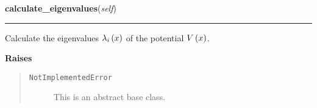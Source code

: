     \vspace{0.5ex}

\hspace{.8\funcindent}\begin{boxedminipage}{\funcwidth}

    \raggedright \textbf{calculate\_eigenvalues}(\textit{self})

    \vspace{-1.5ex}

    \rule{\textwidth}{0.5\fboxrule}
\setlength{\parskip}{2ex}
    Calculate the eigenvalues
    $\lambda_i\left( x \right)$ of the potential
    $V\left( x \right)$.

\setlength{\parskip}{1ex}
      \textbf{Raises}
    \vspace{-1ex}

      \begin{quote}
        \begin{description}

          \item[\texttt{NotImplementedError}]

          This is an abstract base class.

        \end{description}

      \end{quote}

    \end{boxedminipage}

    \label{MatrixPotential:MatrixPotential:evaluate_eigenvalues_at}

    \vspace{0.5ex}


